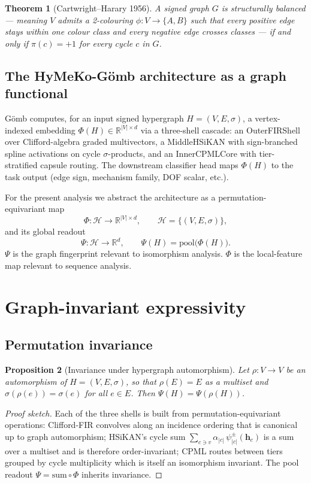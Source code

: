 \documentclass[11pt,a4paper]{article}
\newtheorem{theorem}{Theorem}[section]
\newtheorem{proposition}[theorem]{Proposition}
\newcommand{\sig}{\ensuremath{\sigma}}
\newcommand{\Gomb}{G\"omb}
\begin{document}
\begin{theorem}[Cartwright--Harary 1956]\label{thm:cartwright}
A signed graph $G$ is structurally balanced --- meaning $V$
admits a 2-colouring $\phi: V \to \{A, B\}$ such that every
positive edge stays within one colour class and every negative
edge crosses classes --- if and only if $\pi(c) = +1$ for every
cycle $c$ in $G$.
\end{theorem}

\subsection{The HyMeKo-\Gomb{} architecture as a graph functional}

\Gomb{} computes, for an input signed hypergraph $H = (V, E, \sig)$,
a vertex-indexed embedding $\Phi(H) \in \mathbb{R}^{|V| \times d}$
via a three-shell cascade: an OuterFIRShell over Clifford-algebra
graded multivectors, a MiddleHSiKAN with sign-branched spline
activations on cycle $\sigma$-products, and an InnerCPMLCore with
tier-stratified capsule routing. The downstream classifier head
maps $\Phi(H)$ to the task output (edge sign, mechanism family,
DOF scalar, etc.).

For the present analysis we abstract the architecture as a
permutation-equivariant map
\[
\Phi: \mathcal{H} \longrightarrow \mathbb{R}^{|V| \times d},
\qquad \mathcal{H} = \{(V, E, \sig)\},
\]
and its global readout
\[
\Psi: \mathcal{H} \longrightarrow \mathbb{R}^{d}, \qquad
\Psi(H) = \mathrm{pool}\bigl(\Phi(H)\bigr).
\]
$\Psi$ is the graph fingerprint relevant to isomorphism analysis.
$\Phi$ is the local-feature map relevant to sequence analysis.

\section{Graph-invariant expressivity}

\subsection{Permutation invariance}

\begin{proposition}[Invariance under hypergraph automorphism]
Let $\rho: V \to V$ be an automorphism of $H = (V, E, \sig)$, so
that $\rho(E) = E$ as a multiset and $\sig(\rho(e)) = \sig(e)$
for all $e \in E$. Then $\Psi(H) = \Psi(\rho(H))$.
\end{proposition}

\begin{proof}[Proof sketch]
Each of the three shells is built from permutation-equivariant
operations: Clifford-FIR convolves along an incidence ordering that
is canonical up to graph automorphism; HSiKAN's cycle sum
$\sum_{c \ni v} \alpha_{|c|}\,\psi^{\pm}_{|c|}(\mathbf{h}_c)$ is a
sum over a multiset and is therefore order-invariant; CPML routes
between tiers grouped by cycle multiplicity which is itself an
isomorphism invariant. The pool readout
$\Psi = \mathrm{sum} \circ \Phi$ inherits invariance.
\end{proof}
\end{document}
